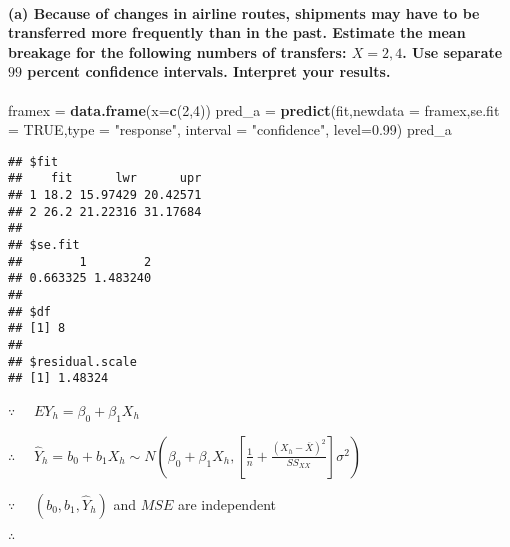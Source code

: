 \documentclass[]{article}
\newenvironment{Shaded}{\begin{snugshade}}{\end{snugshade}}
\newcommand{\KeywordTok}[1]{\textcolor[rgb]{0.13,0.29,0.53}{\textbf{#1}}}
\newcommand{\DataTypeTok}[1]{\textcolor[rgb]{0.13,0.29,0.53}{#1}}
\newcommand{\DecValTok}[1]{\textcolor[rgb]{0.00,0.00,0.81}{#1}}
\newcommand{\FloatTok}[1]{\textcolor[rgb]{0.00,0.00,0.81}{#1}}
\newcommand{\StringTok}[1]{\textcolor[rgb]{0.31,0.60,0.02}{#1}}
\newcommand{\OtherTok}[1]{\textcolor[rgb]{0.56,0.35,0.01}{#1}}
\newcommand{\NormalTok}[1]{#1}
\let\oldparagraph\paragraph
\renewcommand{\paragraph}[1]{\oldparagraph{#1}\mbox{}}
\begin{document}
\paragraph{\texorpdfstring{(a) Because of changes in airline routes,
shipments may have to be transferred more frequently than in the past.
Estimate the mean breakage for the following numbers of transfers:
\(X=2, 4\). Use separate \(99\) percent confidence intervals. Interpret
your
results.}{(a) Because of changes in airline routes, shipments may have to be transferred more frequently than in the past. Estimate the mean breakage for the following numbers of transfers: X=2, 4. Use separate 99 percent confidence intervals. Interpret your results.}}\label{a-because-of-changes-in-airline-routes-shipments-may-have-to-be-transferred-more-frequently-than-in-the-past.-estimate-the-mean-breakage-for-the-following-numbers-of-transfers-x2-4.-use-separate-99-percent-confidence-intervals.-interpret-your-results.}

\begin{Shaded}
\begin{Highlighting}[]
\NormalTok{framex =}\StringTok{ }\KeywordTok{data.frame}\NormalTok{(}\DataTypeTok{x=}\KeywordTok{c}\NormalTok{(}\DecValTok{2}\NormalTok{,}\DecValTok{4}\NormalTok{))}
\NormalTok{pred_a =}\StringTok{ }\KeywordTok{predict}\NormalTok{(fit,}\DataTypeTok{newdata =}\NormalTok{ framex,}\DataTypeTok{se.fit =} \OtherTok{TRUE}\NormalTok{,}\DataTypeTok{type =} \StringTok{"response"}\NormalTok{,}
\DataTypeTok{interval =} \StringTok{"confidence"}\NormalTok{, }\DataTypeTok{level=}\FloatTok{0.99}\NormalTok{)}
\NormalTok{pred_a}
\end{Highlighting}
\end{Shaded}

\begin{verbatim}
## $fit
##    fit      lwr      upr
## 1 18.2 15.97429 20.42571
## 2 26.2 21.22316 31.17684
## 
## $se.fit
##        1        2 
## 0.663325 1.483240 
## 
## $df
## [1] 8
## 
## $residual.scale
## [1] 1.48324
\end{verbatim}

\(\because\quad\) \(EY_h=\beta_0+\beta_1X_h\)

\(\therefore\quad\)
\(\hat{Y}_h=b_0+b_1X_h\sim N\left(\beta_0+\beta_1 X_h,\left[\frac{1}{n}+\frac{(X_h-\overline{X})^2}{SS_{XX}}\right]\sigma^2\right)\)

\(\because\quad\) \((b_0,b_1,\hat{Y}_h)\) and \(MSE\) are independent

\(\therefore\quad\)
\end{document}
